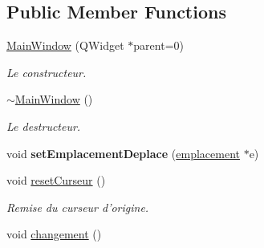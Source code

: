 \subsection*{Public Member Functions}
\begin{DoxyCompactItemize}
\item 
\hyperlink{class_main_window_a8b244be8b7b7db1b08de2a2acb9409db}{Main\-Window} (Q\-Widget $\ast$parent=0)
\begin{DoxyCompactList}\small\item\em Le constructeur. \end{DoxyCompactList}\item 
\hyperlink{class_main_window_ae98d00a93bc118200eeef9f9bba1dba7}{$\sim$\-Main\-Window} ()
\begin{DoxyCompactList}\small\item\em Le destructeur. \end{DoxyCompactList}\item 
\hypertarget{class_main_window_a1eefa05031d74694e4249a8c68741122}{void {\bfseries set\-Emplacement\-Deplace} (\hyperlink{classemplacement}{emplacement} $\ast$e)}\label{class_main_window_a1eefa05031d74694e4249a8c68741122}

\item 
\hypertarget{class_main_window_a3ab75adb0221eb5e362f2070f71ebc22}{void \hyperlink{class_main_window_a3ab75adb0221eb5e362f2070f71ebc22}{reset\-Curseur} ()}\label{class_main_window_a3ab75adb0221eb5e362f2070f71ebc22}

\begin{DoxyCompactList}\small\item\em Remise du curseur d'origine. \end{DoxyCompactList}\item 
\hypertarget{class_main_window_a3c0bedf7eae76f0c5ca35bd16491b919}{void \hyperlink{class_main_window_a3c0bedf7eae76f0c5ca35bd16491b919}{changement} ()}\label{class_main_window_a3c0bedf7eae76f0c5ca35bd16491b919}


\end{DoxyCompactItemize}
